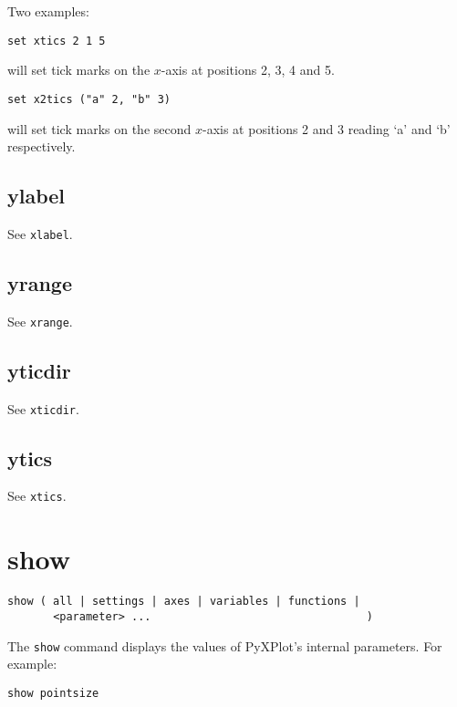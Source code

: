 Two examples:

\begin{verbatim}
set xtics 2 1 5
\end{verbatim}

\noindent will set tick marks on the $x$-axis at positions 2, 3, 4 and 5.

\begin{verbatim}
set x2tics ("a" 2, "b" 3)
\end{verbatim}

\noindent will set tick marks on the second $x$-axis at positions 2 and 3 reading `a' and
`b' respectively.


\subsection{ylabel}

See {\tt xlabel}.


\subsection{yrange}

See {\tt xrange}.
   

\subsection{yticdir}

See {\tt xticdir}.


\subsection{ytics}

See {\tt xtics}.

\section{show}

\begin{verbatim}
show ( all | settings | axes | variables | functions |
       <parameter> ...                                 )
\end{verbatim}

The {\tt show} command displays the values of PyXPlot's internal parameters. For
example:

\begin{verbatim}
show pointsize
\end{verbatim}

